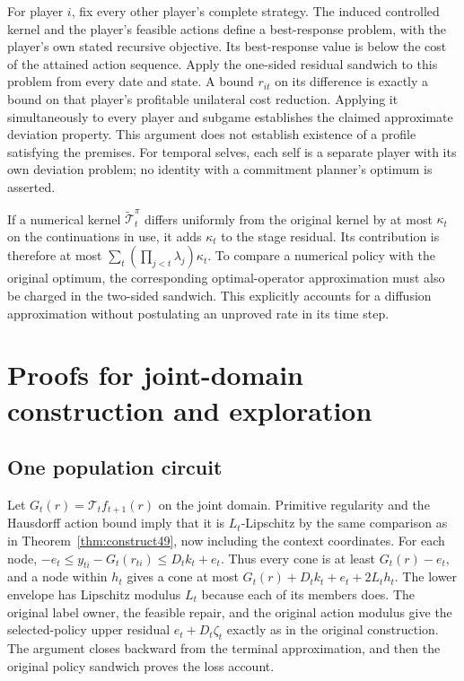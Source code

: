 For player $i$, fix every other player's complete strategy. The induced controlled kernel and the player's feasible actions define a best-response problem, with the player's own stated recursive objective. Its best-response value is below the cost of the attained action sequence. Apply the one-sided residual sandwich to this problem from every date and state. A bound $r_{it}$ on its difference is exactly a bound on that player's profitable unilateral cost reduction. Applying it simultaneously to every player and subgame establishes the claimed approximate deviation property. This argument does not establish existence of a profile satisfying the premises. For temporal selves, each self is a separate player with its own deviation problem; no identity with a commitment planner's optimum is asserted.

If a numerical kernel $\widetilde{\mathcal T}_t^\pi$ differs uniformly from the original kernel by at most $\kappa_t$ on the continuations in use, it adds $\kappa_t$ to the stage residual. Its contribution is therefore at most $\sum_t(\prod_{j<t}\lambda_j)\kappa_t$. To compare a numerical policy with the original optimum, the corresponding optimal-operator approximation must also be charged in the two-sided sandwich. This explicitly accounts for a diffusion approximation without postulating an unproved rate in its time step.

\section{Proofs for joint-domain construction and exploration}\label{supp:population86}
\subsection{One population circuit}
Let $G_t(r)=\mathcal T_tf_{t+1}(r)$ on the joint domain. Primitive regularity and the Hausdorff action bound imply that it is $L_t$-Lipschitz by the same comparison as in Theorem~\ref{thm:construct49}, now including the context coordinates. For each node, $-e_t\le y_{ti}-G_t(r_{ti})\le D_tk_t+e_t$. Thus every cone is at least $G_t(r)-e_t$, and a node within $h_t$ gives a cone at most $G_t(r)+D_tk_t+e_t+2L_th_t$. The lower envelope has Lipschitz modulus $L_t$ because each of its members does. The original label owner, the feasible repair, and the original action modulus give the selected-policy upper residual $e_t+D_t\zeta_t$ exactly as in the original construction. The argument closes backward from the terminal approximation, and then the original policy sandwich proves the loss account.

